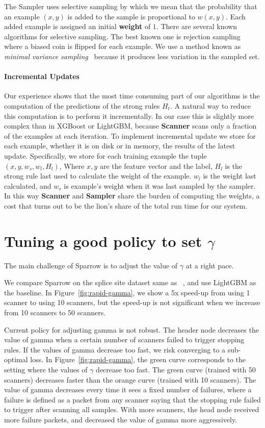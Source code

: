 The Sampler uses selective sampling by which we mean that the
probability that an example $(x,y)$ is added to the sample is
proportional to $w(x,y)$. Each added example is assigned an initial
{\bf weight} of $1$.
{There are several known algorithms
  for selective sampling. The best known one is rejection sampling
  where a biased coin is flipped for each example. We use a method
  known as \textit{minimal variance sampling}~\cite{kitagawa_monte_1996}
  because it produces less variation in the sampled set.}
  
\paragraph*{Incremental Updates} Our experience shows that the most
time consuming part of our algorithms is the computation of the
predictions of the strong rules $H_t$. A natural way to reduce this
computation is to perform it incrementally. In our case this is
slightly more complex than in XGBoost or LightGBM, because {\bf
  Scanner} scans only a  fraction of the examples at each
iteration. To implement incremental update we store for each example,
whether it is on disk or in memory, the results of the latest
update. Specifically, we store for each training example the tuple
$(x, y, w_s, w_l,H_l)$, Where $x,y$ are the feature vector and the
label, $H_l$ is the strong rule last used to calculate the weight of
the example. $w_l$ is the weight last calculated, and $w_s$ is
example's weight when it was last sampled by the sampler. In this way
{\bf Scanner} and {\bf Sampler} share the burden of computing
the weights, a cost that turns out to be the lion's share of the total
run time for our system.




\section{Tuning a good policy to set $\gamma$}

The main challenge of Sparrow is to adjust the value of $\gamma$ at a right pace.

We compare Sparrow on the splice site
dataset same as ~\cite{alafate_sparrow_2019},
and use LightGBM as the baseline.
In Figure~\ref{fig:rapid-gamma},
we show a 5x speed-up from using 1 scanner to
using 10 scanners, but the speed-up is not significant when we increase from 10 scanners to 50 scanners.

Current policy for adjusting gamma is not robust. The header node decreases
the value of gamma when a certain number of scanners failed to trigger stopping
rules.
If the values of gamma decrease too fast, we risk converging to a sub-optimal loss.
In Figure~\ref{fig:rapid-gamma}, the green curve corresponds to the setting
where the values of $\gamma$ decrease too fast.
The green curve (trained with 50 scanners) decreases faster than the orange curve (trained with 10 scanners).
The value of gamma decreases every time it sees a fixed number of failures, where a failure is defined as a packet from any scanner saying that the stopping rule failed to trigger after scanning all samples. With more scanners, the head node received more failure packets, and decreased the value of gamma more aggressively.


